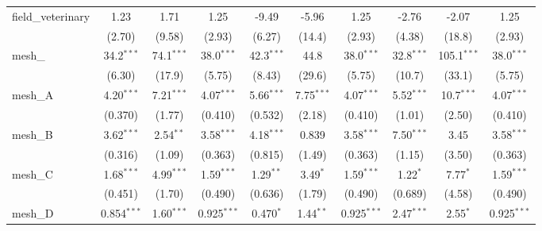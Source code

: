 \begin{tabular}{lccccccccc}
   field\_veterinary                                           & 1.23          & 1.71          & 1.25          & -9.49          & -5.96        & 1.25          & -2.76         & -2.07          & 1.25\\   
                                                               & (2.70)        & (9.58)        & (2.93)        & (6.27)         & (14.4)       & (2.93)        & (4.38)        & (18.8)         & (2.93)\\   
   mesh\_                                                      & 34.2$^{***}$  & 74.1$^{***}$  & 38.0$^{***}$  & 42.3$^{***}$   & 44.8         & 38.0$^{***}$  & 32.8$^{***}$  & 105.1$^{***}$  & 38.0$^{***}$\\   
                                                               & (6.30)        & (17.9)        & (5.75)        & (8.43)         & (29.6)       & (5.75)        & (10.7)        & (33.1)         & (5.75)\\   
   mesh\_A                                                     & 4.20$^{***}$  & 7.21$^{***}$  & 4.07$^{***}$  & 5.66$^{***}$   & 7.75$^{***}$ & 4.07$^{***}$  & 5.52$^{***}$  & 10.7$^{***}$   & 4.07$^{***}$\\   
                                                               & (0.370)       & (1.77)        & (0.410)       & (0.532)        & (2.18)       & (0.410)       & (1.01)        & (2.50)         & (0.410)\\   
   mesh\_B                                                     & 3.62$^{***}$  & 2.54$^{**}$   & 3.58$^{***}$  & 4.18$^{***}$   & 0.839        & 3.58$^{***}$  & 7.50$^{***}$  & 3.45           & 3.58$^{***}$\\   
                                                               & (0.316)       & (1.09)        & (0.363)       & (0.815)        & (1.49)       & (0.363)       & (1.15)        & (3.50)         & (0.363)\\   
   mesh\_C                                                     & 1.68$^{***}$  & 4.99$^{***}$  & 1.59$^{***}$  & 1.29$^{**}$    & 3.49$^{*}$   & 1.59$^{***}$  & 1.22$^{*}$    & 7.77$^{*}$     & 1.59$^{***}$\\   
                                                               & (0.451)       & (1.70)        & (0.490)       & (0.636)        & (1.79)       & (0.490)       & (0.689)       & (4.58)         & (0.490)\\   
   mesh\_D                                                     & 0.854$^{***}$ & 1.60$^{***}$  & 0.925$^{***}$ & 0.470$^{*}$    & 1.44$^{**}$  & 0.925$^{***}$ & 2.47$^{***}$  & 2.55$^{*}$     & 0.925$^{***}$\\   

\end{tabular}
